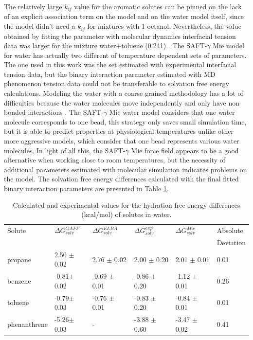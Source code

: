 The relatively large $k_{ij}$ value for the aromatic solutes can be pinned on the lack of an explicit association term on the model and on the water model itself, since the model didn't need a $k_{ij}$ for mixtures with 1-octanol. Nevertheless, the value obtained by fitting the parameter with molecular dynamics interfacial tension data was larger for the mixture water+toluene (0.241) \cite{herdes2017}.  The SAFT-$\gamma$ Mie model for water \cite{lobanova2016} has actually two different of temperature dependent sets of parameters. The one used in this work was the set estimated with experimental interfacial tension data, but the binary interaction parameter estimated with MD phenomenon tension data could not be transferable to solvation free energy calculations. Modeling the water with a coarse grained methodology has a lot of difficulties because the water molecules move independently and only have non bonded interactions \cite{hadley2010,hadley2012}. The  SAFT-$\gamma$ Mie water model considers that one water molecule corresponds to one bead, this strategy only saves small simulation time, but it is able to predict properties at physiological temperatures unlike other more aggressive models, which consider that one bead represents various water molecules. In light of all this, the SAFT-$\gamma$ Mie force field appears to be a good alternative when working close to room temperatures, but the necessity of additional parameters estimated with molecular simulation indicates problems on the model. The solvation free energy differences calculated with the final fitted binary interaction parameters are presented in Table \ref{tbl:solv2}.  

\begin{table}[H]
  \centering
  \caption{Calculated and experimental values for the hydration free energy differences  (kcal/mol) of solutes in water.}
  \label{tbl:solv2}
  \begin{tabular}{llllll}
    \hline
     Solute      & $\Delta G_{solv}^{GAFF}$ & $\Delta G_{solv}^{ELBA}$ & $\Delta G_{solv}^{exp}$ & $\Delta G_{solv}^{Mie}$ & Absolute \\
     & & & & & Deviation \\
    \hline
    propane          &2.50 $\pm$0.02 & 2.76 $\pm$ 0.02&  2.00 $\pm$ 0.20 & 2.01 $\pm$ 0.01     & 0.01 \\
    benzene          &-0.81$\pm$0.02& -0.69 $\pm$ 0.01& -0.86 $\pm$ 0.20 & -1.12 $\pm$ 0.01    &  0.26\\  
    toluene          &-0.79$\pm$0.03& -0.76 $\pm$ 0.01& -0.83 $\pm$ 0.20 & -0.84 $\pm$ 0.01    &  0.01\\
    phenanthrene    &-5.26$\pm$0.03& -                & -3.88 $\pm$ 0.60 & -3.47 $\pm$ 0.02    & 0.41 \\
    \hline
  \end{tabular}

\end{table}

